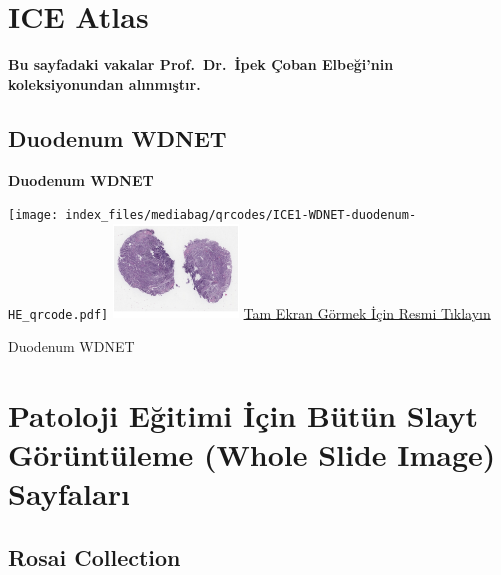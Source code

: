 \documentclass[
  letterpaper,
  DIV=11,
  numbers=noendperiod]{scrreprt}
\begin{document}
\hypertarget{ice-atlas}{%
\chapter{ICE Atlas}\label{ice-atlas}}

\textbf{Bu sayfadaki vakalar Prof.~Dr.~İpek Çoban Elbeği'nin
koleksiyonundan alınmıştır.}

\hypertarget{sec-ICE1-WDNET-duodenum}{%
\section{Duodenum WDNET}\label{sec-ICE1-WDNET-duodenum}}

\textbf{Duodenum WDNET}

\texttt{[image: index\_files/mediabag/qrcodes/ICE1-WDNET-duodenum-HE\_qrcode.pdf]}
\href{https://images.patolojiatlasi.com/ICE1-WDNET-duodenum/HE.html}{\includegraphics[width=0.25\textwidth,height=\textheight]{./screenshots/thumbnail_ICE1-WDNET-duodenum-HE.png}}
\href{https://images.patolojiatlasi.com/ICE1-WDNET-duodenum/HE.html}{Tam
Ekran Görmek İçin Resmi Tıklayın}

\begin{tcolorbox}[enhanced jigsaw, breakable, opacitybacktitle=0.6, arc=.35mm, colbacktitle=quarto-callout-tip-color!10!white, colback=white, toptitle=1mm, left=2mm, opacityback=0, colframe=quarto-callout-tip-color-frame, titlerule=0mm, rightrule=.15mm, bottomrule=.15mm, toprule=.15mm, bottomtitle=1mm, title=\textcolor{quarto-callout-tip-color}{\faLightbulb}\hspace{0.5em}{Tanı}, coltitle=black, leftrule=.75mm]

Duodenum WDNET

\end{tcolorbox}

\hypertarget{sec-wsi-sayfalari}{%
\chapter{Patoloji Eğitimi İçin Bütün Slayt Görüntüleme (Whole Slide
Image) Sayfaları}\label{sec-wsi-sayfalari}}

\hypertarget{sec-rosai-collection}{%
\section{Rosai Collection}\label{sec-rosai-collection}}
\end{document}
